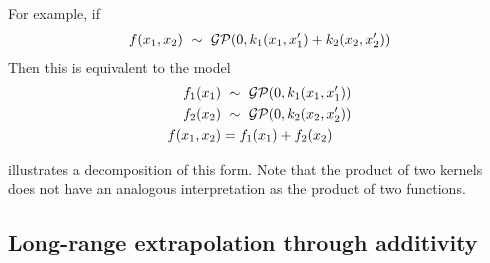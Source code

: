 %
For example, if
%
\begin{align}
f(x_1, x_2) \ \sim\  \mathcal{GP}(0, k_1(x_1, x_1') + k_2(x_2, x_2'))
\end{align}
%
Then this is equivalent to the model
%
\begin{align}
f_1(x_1) & \ \sim\  \mathcal{GP}(0, k_1(x_1, x_1'))\\
f_2(x_2) & \ \sim\  \mathcal{GP}(0, k_2(x_2, x_2'))\\
f(x_1, x_2) & = f_1(x_1) + f_2(x_2)
\end{align}
%
%

 illustrates a decomposition of this form.
Note that the product of two kernels does not have an analogous interpretation as the product of two functions.


\subsection{Long-range extrapolation through additivity}
\label{sec:additivity-extrapolation}

